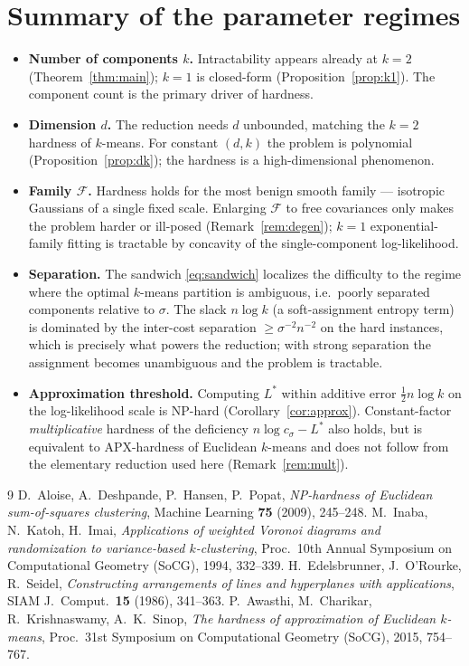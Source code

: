\documentclass{amsart}
\theoremstyle{plain}
\theoremstyle{definition}
\begin{document}
\section{Summary of the parameter regimes}

\begin{itemize}
\item \textbf{Number of components $k$.} Intractability appears already at $k=2$
(Theorem~\ref{thm:main}); $k=1$ is closed-form (Proposition~\ref{prop:k1}). The
component count is the primary driver of hardness.
\item \textbf{Dimension $d$.} The reduction needs $d$ unbounded, matching the
$k=2$ hardness of $k$-means. For constant $(d,k)$ the problem is polynomial
(Proposition~\ref{prop:dk}); the hardness is a high-dimensional phenomenon.
\item \textbf{Family $\mathcal F$.} Hardness holds for the most benign smooth
family --- isotropic Gaussians of a single fixed scale. Enlarging $\mathcal F$ to
free covariances only makes the problem harder or ill-posed
(Remark~\ref{rem:degen}); $k=1$ exponential-family fitting is tractable by
concavity of the single-component log-likelihood.
\item \textbf{Separation.} The sandwich \eqref{eq:sandwich} localizes the
difficulty to the regime where the optimal $k$-means partition is ambiguous, i.e.\
poorly separated components relative to $\sigma$. The slack $n\log k$ (a
soft-assignment entropy term) is dominated by the inter-cost separation
$\ge\sigma^{-2}n^{-2}$ on the hard instances, which is precisely what powers the
reduction; with strong separation the assignment becomes unambiguous and the
problem is tractable.
\item \textbf{Approximation threshold.} Computing $L^{\ast}$ within additive error
$\tfrac12 n\log k$ on the log-likelihood scale is NP-hard
(Corollary~\ref{cor:approx}). Constant-factor \emph{multiplicative} hardness of
the deficiency $n\log c_{\sigma}-L^{\ast}$ also holds, but is equivalent to
APX-hardness of Euclidean $k$-means \cite{ACKS} and does not follow from the
elementary reduction used here (Remark~\ref{rem:mult}).
\end{itemize}

\begin{thebibliography}{9}
 D.~Aloise, A.~Deshpande, P.~Hansen, P.~Popat,
\emph{NP-hardness of Euclidean sum-of-squares clustering},
Machine Learning \textbf{75} (2009), 245--248.
 M.~Inaba, N.~Katoh, H.~Imai,
\emph{Applications of weighted Voronoi diagrams and randomization to
variance-based $k$-clustering}, Proc.\ 10th Annual Symposium on Computational
Geometry (SoCG), 1994, 332--339.
 H.~Edelsbrunner, J.~O'Rourke, R.~Seidel,
\emph{Constructing arrangements of lines and hyperplanes with applications},
SIAM J.\ Comput.\ \textbf{15} (1986), 341--363.
 P.~Awasthi, M.~Charikar, R.~Krishnaswamy, A.~K.~Sinop,
\emph{The hardness of approximation of Euclidean $k$-means},
Proc.\ 31st Symposium on Computational Geometry (SoCG), 2015, 754--767.
\end{thebibliography}
\end{document}
